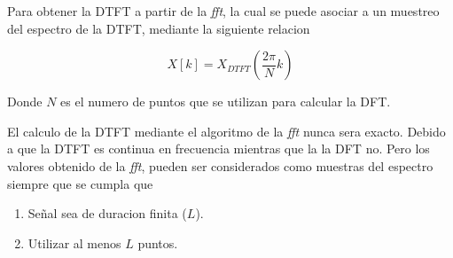 \documentclass[letterpaper]{article}
\begin{document}
    Para obtener la DTFT a partir de la \textit{fft}, la cual se puede asociar a un muestreo del espectro
    de la DTFT, mediante la siguiente relacion 

    \begin{equation}
        X[k]=X_{DTFT}\left(  \frac{2 \pi}{N} k \right)
    \end{equation}

    Donde $N$ es el numero de puntos que se utilizan para calcular la DFT.

    El calculo de la DTFT mediante el algoritmo de la \textit{fft} nunca sera exacto. Debido a que la DTFT es continua en frecuencia 
    mientras que la la DFT no. Pero los valores obtenido de la \textit{fft}, pueden ser considerados como muestras del espectro siempre que se 
    cumpla que 

    \begin{enumerate}
        \item Señal sea de duracion finita ($L$).
        \item Utilizar al menos $L$ puntos.
    \end{enumerate}
\end{document}
